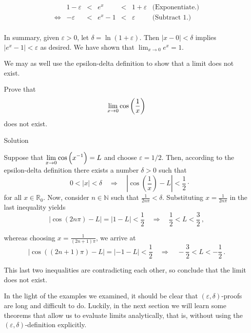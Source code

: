 \begin{example}
$$
\begin{array}{rrcccll}
&1-\varepsilon &<& e^x &<& 1+\varepsilon &  \textrm{(Exponentiate.)}\\
\Leftrightarrow&-\varepsilon &<& e^x - 1 &<& \varepsilon &  \textrm{(Subtract 1.)}\\
\end{array}
$$

In summary, given $\varepsilon > 0$, let $\delta = \ln(1+\varepsilon)$. Then $|x - 0| < \delta$ implies $|e^x - 1|< \varepsilon$ as desired.  We have shown that $\displaystyle \lim_{x\rightarrow 0} e^x = 1 $.
\end{example}


We may as well use the epsilon-delta definition to show that a limit does not exist. 

\begin{example}
Prove that 
$$ \displaystyle\lim_{x\rightarrow 0} \cos\left(\dfrac{1}{x}\right) $$ 
does not exist.


Solution 

Suppose that $\displaystyle\lim_{x\rightarrow 0} \cos\left(x^{-1}\right)=L$ and choose $\varepsilon=1/2$. Then, according to the epsilon-delta definition there exists a number $\delta > 0$ such that 
\[
\quad 0<|x|<\delta \quad \Rightarrow  \quad \left|\cos\left(\dfrac{1}{x}\right)-L\right|<\dfrac{1}{2}\cdot
\]
for all $x \in \mathbb{R}_0$. Now, consider  $n\in \mathbb{N}$ such that $\frac{1}{2n\pi}<\delta$. Substituting $x=\frac{1}{2n\pi}$ in the last inequality yields
\[ |\cos (2n\pi)-L|=|1-L|<\dfrac{1}{2} \quad \Rightarrow \quad \dfrac{1}{2}<L<\dfrac{3}{2}\,,\]

whereas choosing $x=\frac{1}{(2n+1)\pi}$, we arrive at 
\[ |\cos\left((2n+1)\pi\right)-L|=|-1-L|<\dfrac{1}{2} \quad \Rightarrow \quad -\dfrac{3}{2}<L<-\dfrac{1}{2}\, .\]

This last two inequalities are contradicting each other, so conclude that the limit does not exist. 
\end{example}




In the light of the examples we examined, it should be clear that $(\varepsilon,\delta)$-proofs are long and difficult to do. Luckily, in the next section we will learn some theorems that allow us to evaluate limits analytically, that is, without using the $(\varepsilon,\delta)$-definition explicitly.



